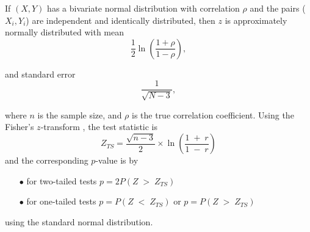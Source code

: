 \begin{framed}
If $(X, Y)$ has a bivariate normal distribution with correlation $\rho$ and the pairs ($X_i, Y_i$) are independent and identically distributed, then $z$ is approximately normally distributed with mean
\[ {\displaystyle \frac{1}{ 2}\ln \left(   \frac{1+\rho }{1-\rho } \right),} \]

and standard error
\[ {\displaystyle \frac{1}{  \sqrt {N-3} } ,} \]

where $n$ is the sample size, and $\rho$ is the true correlation coefficient.
Using the Fisher's $z$-transform , the test statistic is 
\[Z_{TS} = \frac{ \sqrt{n-3} }{2} \times \ln \left( \frac{1 \;+\; r}{ 1 \;-\;r} \right) \]
and the corresponding $p$-value is by

\begin{itemize}
\item[$\bullet$] for two-tailed tests $p=2P(Z\;>\;Z_{TS})$
\item[$\bullet$] for one-tailed tests $p=P(Z\;<\;Z_{TS})$ or $p=P(Z\;>\;Z_{TS})$
\end{itemize}
using the standard normal distribution.

%
%
\end{framed}


